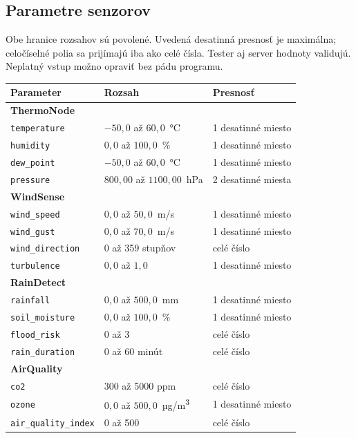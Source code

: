 \documentclass[12pt,a4paper]{article}
\begin{document}
\subsection{Parametre senzorov}

Obe hranice rozsahov sú povolené. Uvedená desatinná presnosť je maximálna; celočíselné polia sa prijímajú iba ako celé čísla. Tester aj server hodnoty validujú. Neplatný vstup možno opraviť bez pádu programu.

\begin{center}
\small\singlespacing
\begin{tabular}{p{5.3cm} p{4.2cm} p{3.2cm}}
\hline
\textbf{Parameter} & \textbf{Rozsah} & \textbf{Presnosť} \\
\hline
\multicolumn{3}{l}{\textbf{ThermoNode}} \\
\texttt{temperature} & $-50{,}0$ až $60{,}0$~°C & 1 desatinné miesto \\
\texttt{humidity} & $0{,}0$ až $100{,}0$~\% & 1 desatinné miesto \\
\texttt{dew\_point} & $-50{,}0$ až $60{,}0$~°C & 1 desatinné miesto \\
\texttt{pressure} & $800{,}00$ až $1100{,}00$~hPa & 2 desatinné miesta \\
\hline
\multicolumn{3}{l}{\textbf{WindSense}} \\
\texttt{wind\_speed} & $0{,}0$ až $50{,}0$~m/s & 1 desatinné miesto \\
\texttt{wind\_gust} & $0{,}0$ až $70{,}0$~m/s & 1 desatinné miesto \\
\texttt{wind\_direction} & 0 až 359 stupňov & celé číslo \\
\texttt{turbulence} & $0{,}0$ až $1{,}0$ & 1 desatinné miesto \\
\hline
\multicolumn{3}{l}{\textbf{RainDetect}} \\
\texttt{rainfall} & $0{,}0$ až $500{,}0$~mm & 1 desatinné miesto \\
\texttt{soil\_moisture} & $0{,}0$ až $100{,}0$~\% & 1 desatinné miesto \\
\texttt{flood\_risk} & 0 až 3 & celé číslo \\
\texttt{rain\_duration} & 0 až 60 minút & celé číslo \\
\hline
\multicolumn{3}{l}{\textbf{AirQuality}} \\
\texttt{co2} & 300 až 5000 ppm & celé číslo \\
\texttt{ozone} & $0{,}0$ až $500{,}0$~µg/m\textsuperscript{3} & 1 desatinné miesto \\
\texttt{air\_quality\_index} & 0 až 500 & celé číslo \\
\hline
\end{tabular}
\end{center}
\end{document}
